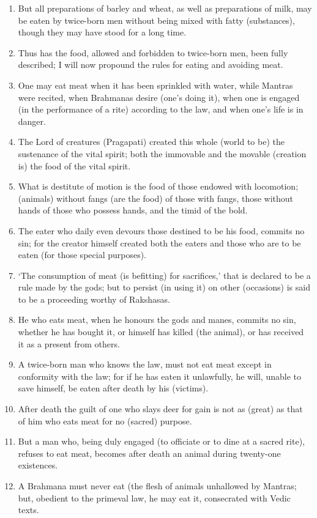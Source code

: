 \begin{enumerate}
\item But all preparations of barley and wheat, as well as preparations of milk, may be eaten by twice-born men without being mixed with fatty (substances), though they may have stood for a long time.
\item Thus has the food, allowed and forbidden to twice-born men, been fully described; I will now propound the rules for eating and avoiding meat.
\item One may eat meat when it has been sprinkled with water, while Mantras were recited, when Brahmanas desire (one's doing it), when one is engaged (in the performance of a rite) according to the law, and when one's life is in danger.
\item The Lord of creatures (Pragapati) created this whole (world to be) the sustenance of the vital spirit; both the immovable and the movable (creation is) the food of the vital spirit.
\item What is destitute of motion is the food of those endowed with locomotion; (animals) without fangs (are the food) of those with fangs, those without hands of those who possess hands, and the timid of the bold.
\item The eater who daily even devours those destined to be his food, commits no sin; for the creator himself created both the eaters and those who are to be eaten (for those special purposes).
\item `The consumption of meat (is befitting) for sacrifices,' that is declared to be a rule made by the gods; but to persist (in using it) on other (occasions) is said to be a proceeding worthy of Rakshasas.
\item He who eats meat, when he honours the gods and manes, commits no sin, whether he has bought it, or himself has killed (the animal), or has received it as a present from others.
\item A twice-born man who knows the law, must not eat meat except in conformity with the law; for if he has eaten it unlawfully, he will, unable to save himself, be eaten after death by his (victims).
\item After death the guilt of one who slays deer for gain is not as (great) as that of him who eats meat for no (sacred) purpose.
\item But a man who, being duly engaged (to officiate or to dine at a sacred rite), refuses to eat meat, becomes after death an animal during twenty-one existences.
\item A Brahmana must never eat (the flesh of animals unhallowed by Mantras; but, obedient to the primeval law, he may eat it, consecrated with Vedic texts.

\end{enumerate}
